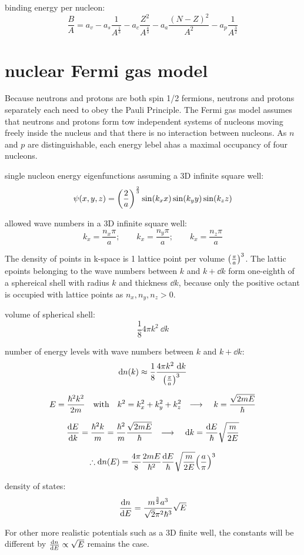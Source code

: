\documentclass[10pt, a4paper, twocolumn]{article}
\newcommand{\arr}{\ensuremath{\longrightarrow\ }}
\begin{document}
binding energy per nucleon:
\[\frac{B}{A}
=a_v-a_s\frac{1}{A^\frac13}-a_c\frac{Z^2}{A^\frac43}
-a_a\frac{(N-Z)^2}{A^2}-a_p\frac{1}{A^\frac32} \]

\section{nuclear Fermi gas model}
Because neutrons and protons are both spin 1/2 fermions, neutrons and protons separately each need to obey the Pauli Principle. The Fermi gas model assumes that neutrons and protons form tow independent systems of nucleons moving freely inside the nucleus and that there is no interaction between nucleons. As $n$ and $p$ are distinguishable, each energy lebel ahas a maximal occupancy of four nucleons.

single nucleon energy eigenfunctions assuming a 3D infinite square well:
\[\psi (x,y,z)=\qty(\frac{2}{a})^\frac23
\sin(k_xx)\sin(k_yy)\sin(k_zz)\]

allowed wave numbers in a 3D infinite square well:
\[ k_x=\frac{n_x\pi}{a};\qquad k_x=\frac{n_y\pi}{a};\qquad
k_x=\frac{n_z\pi}{a} \]

The density of points in k-space is 1 lattice point per volume $\qty(\frac{\pi}{a})^3$. The lattic epoints belonging to the wave numbers between $k$ and $k+\dd k$ form one-eighth of a sphereical shell with radius $k$ and thickness $\dd k$, because only the positive octant is occupied with lattice points as $n_x,n_y,n_z>0$.

volume of spherical shell:
\[\frac18 4\pi k^2\ \dd k\]

number of energy levels with wave numbers between $k$ and $k+\dd k$:
\[\dd n(k) \approx \frac18
\frac{4\pi k^2\ \dd k}{\qty(\frac{\pi}{a})^3} \]

\[E=\frac{\hbar ^2 k^2}{2m} \qq{with} k^2=k_x^2+k_y^2+k_z^2
\qq{\arr} k=\frac{\sqrt{2mE}}{\hbar}\]

\[\dv{E}{k} = \frac{\hbar ^2k}{m} = \frac{\hbar ^2}{m}
\frac{\sqrt{2mE}}{\hbar}
\qq{\arr} \dd k = \frac{\dd E}{\hbar}\sqrt{\frac{m}{2E}} \]

\[\therefore \dd n(E) =
\frac{4\pi}{8}\frac{2mE}{\hbar ^2}\frac{\dd E}{\hbar}
\sqrt{\frac{m}{2E}}\qty(\frac{a}{\pi})^3 \]

density of states:
\[\dv{n}{E} = \frac{m^\frac32 a^3}{\sqrt 2 \pi ^2 \hbar ^3}
\sqrt E \]

For other more realistic potentials such as a 3D finite well, the constants will be different by $\dv{n}{E} \propto \sqrt E$ remains the case.
\end{document}
